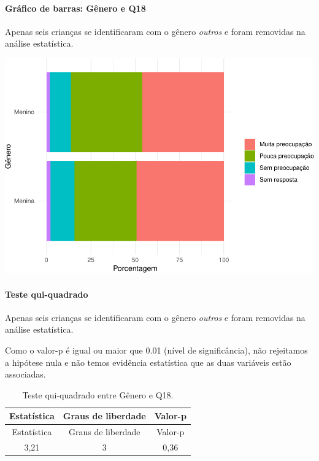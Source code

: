 \documentclass[]{article}
\let\oldparagraph\paragraph
\renewcommand{\paragraph}[1]{\oldparagraph{#1}\mbox{}}
\begin{document}
\hypertarget{gruxe1fico-de-barras-guxeanero-e-q18}{%
\paragraph{Gráfico de barras: Gênero e Q18}\label{gruxe1fico-de-barras-guxeanero-e-q18}}

Apenas seis crianças se identificaram com o gênero \emph{outros} e foram removidas na análise estatística.

\begin{center}\includegraphics[width=0.75\linewidth]{relatorio_covid19_files/figure-latex/unnamed-chunk-260-1} \end{center}

\hypertarget{teste-qui-quadrado-23}{%
\paragraph{Teste qui-quadrado}\label{teste-qui-quadrado-23}}

Apenas seis crianças se identificaram com o gênero \emph{outros} e foram removidas na análise estatística.

Como o valor-p é igual ou maior que 0.01 (nível de significância), não rejeitamos a hipótese nula e não temos evidência estatística que as duas variáveis estão associadas.

\begin{longtable}[]{@{}ccc@{}}
\caption{\label{tab:unnamed-chunk-262}Teste qui-quadrado entre Gênero e Q18.}\tabularnewline
\toprule
Estatística & Graus de liberdade & Valor-p\tabularnewline
\midrule
\endfirsthead
\toprule
Estatística & Graus de liberdade & Valor-p\tabularnewline
\midrule
\endhead
3,21 & 3 & 0,36\tabularnewline
\bottomrule
\end{longtable}

\cleardoublepage
\end{document}
